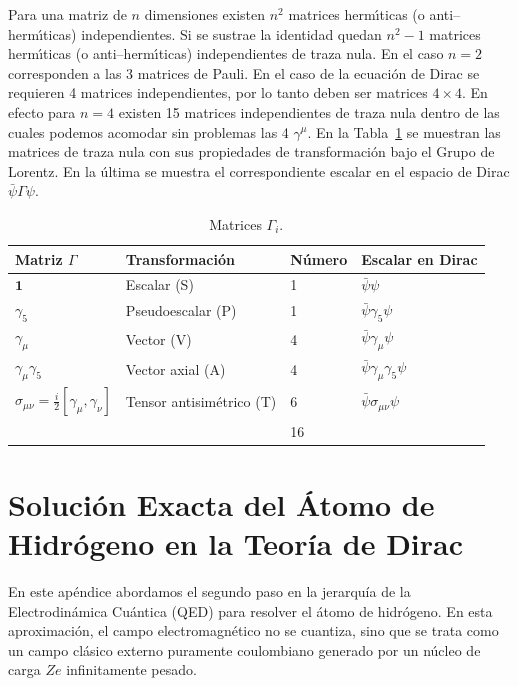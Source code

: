 Para una matriz de $n$ dimensiones existen $n^2$ matrices herm\'\i ticas (o anti--herm\'\i ticas) independientes. Si se sustrae la identidad quedan $n^2-1$ matrices herm\'\i ticas (o anti--herm\'\i ticas) independientes de traza nula. En el caso $n=2$ corresponden a las 3 matrices de Pauli. En el caso de la ecuaci\'on de Dirac se requieren 4 matrices independientes, por lo tanto deben ser matrices $4\times4$. En efecto para $n=4$ existen 15 matrices independientes de traza nula dentro de las cuales podemos acomodar sin problemas las 4 $\gamma^\mu$. En la Tabla~\ref{tab:Gamma} se muestran las matrices de traza nula con sus propiedades de transformaci\'on bajo el Grupo de Lorentz. En la \'ultima se muestra el correspondiente escalar en el espacio de Dirac $\bar\psi\Gamma\psi$.
\begin{table} %
  \centering %
  \begin{tabular}{l|l|l|l} %
Matriz $\Gamma$&Transformaci\'on&N\'umero&Escalar en Dirac\\\hline{}
$\mathbf{1}$&Escalar (S)&1&$\bar\psi\psi$\\
$\gamma_5$&Pseudoescalar (P)&1&$\bar\psi\gamma_5\psi$\\
$\gamma_\mu$&Vector (V)&4&$\bar\psi\gamma_\mu\psi$\\
$\gamma_\mu\gamma_5$ &Vector axial (A)&4&$\bar\psi\gamma_\mu\gamma_5\psi$\\
$\sigma_{\mu\nu}=\frac{i}{2}\left[\gamma_\mu,\gamma_\nu\right]$&Tensor antisim\'etrico (T)&6&$\bar\psi\sigma_{\mu\nu}\psi$\\\hline{}
&&16&\\
  \end{tabular} %
  \caption{Matrices $\Gamma_i$.} %
\label{tab:Gamma} %
\end{table} %


\chapter{Solución Exacta del Átomo de Hidrógeno en la Teoría de Dirac}
\label{ap:hidrogeno_dirac}

En este apéndice abordamos el segundo paso en la jerarquía de la Electrodinámica Cuántica (QED) para resolver el átomo de hidrógeno. En esta aproximación, el campo electromagnético no se cuantiza, sino que se trata como un campo clásico externo puramente coulombiano generado por un núcleo de carga $Ze$ infinitamente pesado. 

